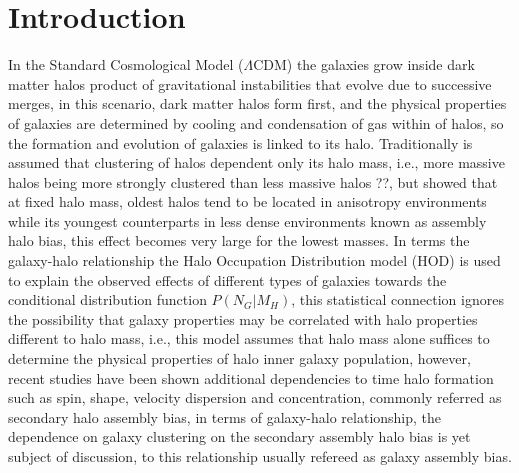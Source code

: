\documentclass[a4paper,fleqn,usenatbib]{mnras}
\begin{document}
\section{Introduction}
In the Standard Cosmological Model ($\Lambda$CDM) the galaxies grow inside dark matter halos product of gravitational instabilities that evolve due to successive merges, in this scenario, dark matter halos form first, and the physical properties of galaxies are determined by cooling and condensation of gas within of halos, so the formation and evolution of galaxies is linked to its halo. 
Traditionally is assumed that clustering of halos dependent only its halo mass, i.e., more massive halos being more strongly clustered than less massive halos \citep{1984ApJ...284L...9K}??, but \citet{2005MNRAS.363L..66G} showed that at fixed halo mass, oldest halos tend to be located in anisotropy environments while its youngest counterparts in less dense environments known as assembly halo bias, this effect becomes very large for the lowest masses. 
In terms the galaxy-halo relationship the Halo Occupation Distribution model (HOD) is used to explain the observed effects of different types of galaxies towards the conditional distribution function $P(N_G|M_H)$, this statistical connection ignores the possibility that galaxy properties may be correlated with halo properties different to halo mass, i.e., this model assumes that halo mass alone suffices to determine the physical properties of halo inner galaxy population, however, recent studies have been shown additional dependencies to time halo formation such as spin, shape, velocity dispersion and concentration, commonly referred as secondary halo assembly bias, in terms of galaxy-halo relationship, the dependence on galaxy clustering on the secondary assembly halo bias is yet subject of discussion, to this relationship usually refereed as galaxy assembly bias.\\
\end{document}
